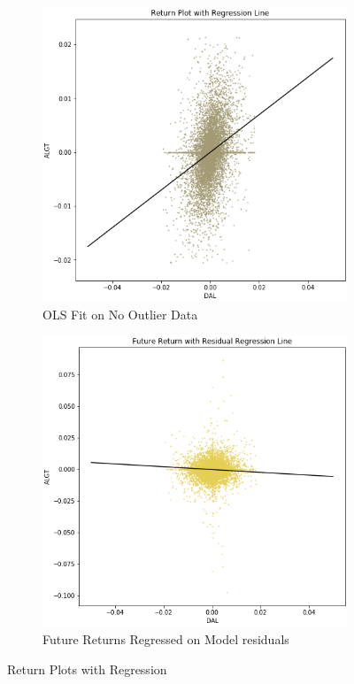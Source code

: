 \documentclass{article}
\begin{document}
\begin{figure}[h!]
  \centering
  \begin{subfigure}{.5\textwidth}
    \centering
    \includegraphics[width=.95\linewidth]{../Figures/return_plot_wReg.png}
    \caption{OLS Fit on No Outlier Data}
  \end{subfigure}%
  \begin{subfigure}{.5\textwidth}
    \centering
    \includegraphics[width=.95\linewidth]{../Figures/return_plot_wResidReg.png}
    \caption{Future Returns Regressed on Model residuals}
  \end{subfigure}
  \caption{Return Plots with Regression}
\end{figure}
\end{document}
